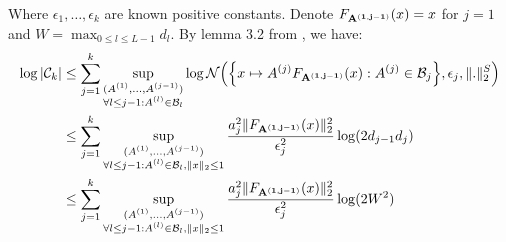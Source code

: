 \noindent Where $\epsilon_1, \dots, \epsilon_k$ are known positive constants. Denote $F_{\bf A^{(1, j-1)}}(x)=x$ for $j=1$ and $W=\max_{0\le l \le L-1}d_l$. By lemma 3.2 from \cite{article:bartlett}, we have:
\begin{align*}
    \log|\mathcal{C}_k| 
    &\le \sum_{j=1}^k\sup_{
        \substack{
            (A^{(1)}, \dots, A^{(j-1)}) \\ \forall l \le j-1: A^{(l)}\in\mathcal{B}_l
        }
    }\log\mathcal{N}\Big( 
        \Big\{ 
            x \mapsto A^{(j)}F_{\bf A^{(1, j-1)}}(x) : A^{(j)} \in \mathcal{B}_j
         \Big\}, \epsilon_j, \|.\|_2^S
     \Big) \\
    &\le \sum_{j=1}^k\sup_{
        \substack{
            (A^{(1)}, \dots, A^{(j-1)}) \\ \forall l \le j-1: A^{(l)}\in\mathcal{B}_l, \|x\|_2 \le 1
        }
    }\frac{a_j^2\|F_{\bf A^{(1, j-1)}}(x)\|_2^2}{\epsilon_j^2}\log(2d_{j-1}d_j) \\
    &\le \sum_{j=1}^k\sup_{
        \substack{
            (A^{(1)}, \dots, A^{(j-1)}) \\ \forall l \le j-1: A^{(l)}\in\mathcal{B}_l, \|x\|_2 \le 1
        }
    }\frac{a_j^2\|F_{\bf A^{(1, j-1)}}(x)\|_2^2}{\epsilon_j^2}\log(2W^2) \\
\end{align*}
